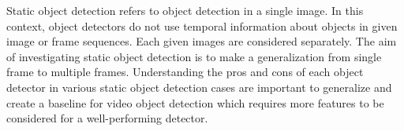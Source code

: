 \documentclass{article}
\begin{document}
\setlength{\parindent}{6ex}

\indent

Static object detection refers to object detection in a single image.
In this context, object detectors do not use temporal information about
objects in given image or frame sequences. Each given images are considered
separately. The aim of investigating static object detection is to make a 
generalization from single frame to multiple frames. Understanding the pros 
and cons of each object detector in various static object detection cases 
are important to generalize and create a baseline for video object detection 
which requires more features to be considered for a well-performing detector. \par
\end{document}
